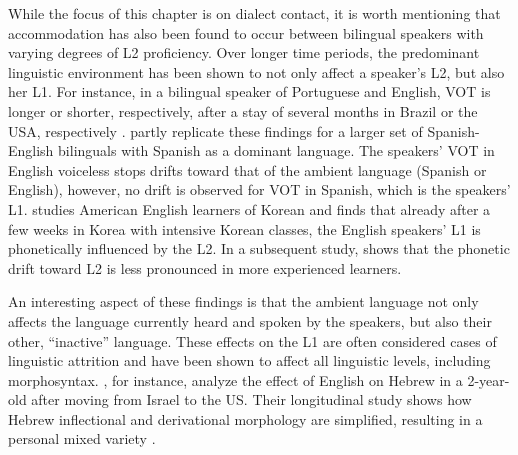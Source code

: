 \documentclass[output=paper,
modfonts
]{langscibook}
\begin{document}
While the focus of this chapter is on dialect contact, it is worth mentioning that accommodation has also been found to occur between bilingual speakers with varying degrees of L2 proficiency. Over longer time periods, the predominant linguistic environment has been shown to not only affect a speaker's L2, but also her L1. For instance, in a bilingual speaker of Portuguese and English, VOT is longer or shorter, respectively, after a stay of several months in Brazil or the USA, respectively \citep{sancier_gestural_1997}. \citet{tobin_phonetic_2017} partly replicate these findings for a larger set of Spanish-English bilinguals with Spanish as a dominant language. The speakers' VOT in English voiceless stops drifts toward that of the ambient language (Spanish or English), however, no drift is observed for VOT in Spanish, which is the speakers' L1. 
\cite{chang_rapid_2012} studies American English learners of Korean and finds that already after a few weeks in Korea with intensive Korean classes, the English speakers' L1 is phonetically influenced by the L2. In a subsequent study, \cite{chang_novelty_2013} shows that the phonetic drift toward L2 is less pronounced in more experienced learners.

An interesting aspect of these findings is that the ambient language not only affects the language currently heard and spoken by the speakers, but also their other, ``inactive'' language. These effects on the L1 are often considered cases of linguistic attrition and have been shown to affect all linguistic levels, including morphosyntax. \citet{kaufman_morphological_1991}, for instance, analyze the effect of English on Hebrew in a 2-year-old after moving from Israel to the US. Their longitudinal study shows how Hebrew inflectional and derivational morphology are simplified, resulting in a personal mixed variety \citep[][see also Chapter 5 of this handbook]{kaufman_morphological_1991}.%
% 
% 
% 
% 
% 
% 
\end{document}
